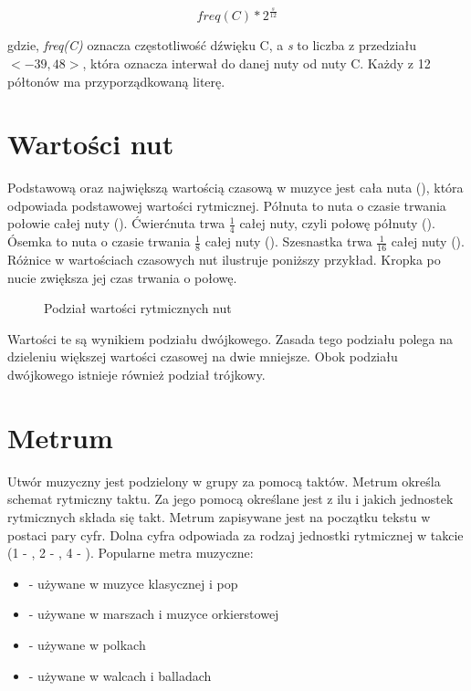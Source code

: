 \documentclass[]{book}
\theoremstyle{definition}
\begin{document}
\begin{appendices}
	\begin{equation}
		freq(C) * 2^{\frac{s}{12}}		
	\end{equation}

	gdzie, \textit{freq(C)} oznacza częstotliwość dźwięku C, a \textit{s} to liczba z przedziału $<-39, 48>$, która oznacza interwał do danej nuty od nuty C. Każdy z 12 półtonów ma przyporządkowaną literę. 
	
	\section{Wartości nut}
	Podstawową oraz największą wartością czasową w muzyce jest cała nuta (\musWhole), która odpowiada podstawowej wartości rytmicznej. Półnuta to nuta o czasie trwania połowie całej nuty (\musHalf). Ćwierćnuta trwa $\frac{1}{4}$ całej nuty, czyli połowę półnuty (\musQuarter). Ósemka to nuta o czasie trwania $\frac{1}{8}$ całej nuty (\musEighth). Szesnastka trwa $\frac{1}{16}$ całej nuty (\musSixteenth).  Różnice w wartościach czasowych nut ilustruje poniższy przykład. Kropka po nucie zwiększa jej czas trwania o połowę.
		 
	\begin{figure}[H]
	\begin{center}
		\scalebox{1.8}{
	\begin{forest} 
		[ \musWhole
		[\musHalf
		[ \musQuarter
		[ \musEighth ] 
		[ \musEighth ] 
		]
		[ \musQuarter
		[ \musEighthDotted ] 
		[ \musSixteenth ] 
		]
		]
		[\musHalf
		[ \musQuarterDotted
		[ \musEighth ] 
		[ \musEighth ] 	[ \musEighth ] 
		]
		[ \musEighth
		[ \musSixteenth ] 
		[ \musSixteenth ] 
		]
		]
		]
		]
	\end{forest}
}
 \caption{Podział wartości rytmicznych nut}
 
\end{center}
\end{figure}

	Wartości te są wynikiem podziału dwójkowego. Zasada tego podziału polega na dzieleniu większej wartości czasowej na dwie mniejsze. Obok podziału dwójkowego istnieje również podział trójkowy.
	
	\section{Metrum}
	Utwór muzyczny jest podzielony w grupy za pomocą taktów. Metrum określa schemat rytmiczny taktu. Za jego pomocą określane jest z ilu i jakich jednostek rytmicznych składa się takt. Metrum zapisywane jest na początku tekstu w postaci pary cyfr. Dolna cyfra odpowiada za rodzaj jednostki rytmicznej w takcie (1 - \musWhole, 2 - \halfnote, 4 - \quarternote ). Popularne metra muzyczne:
	\begin{itemize}
		\item {} - używane w muzyce klasycznej i pop
		\item {} - używane w marszach i muzyce orkierstowej
		\item {} - używane w polkach
		\item {} - używane w walcach i balladach
	\end{itemize}


\end{appendices}
\end{document}
